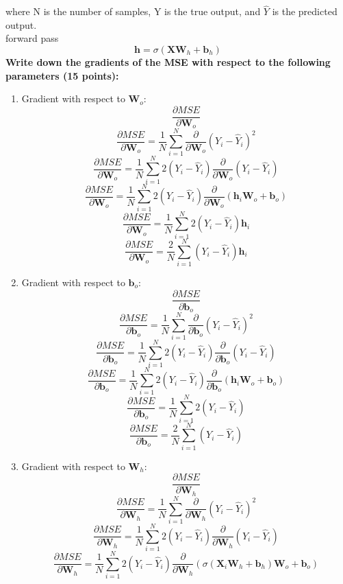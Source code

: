 \documentclass{article}
\begin{document}
where N is the number of samples, Y is the true output, and \(\hat{Y}\) is the predicted output.
\\ forward pass
\[
\mathbf{h} = \sigma(\mathbf{X} \mathbf{W}_h + \mathbf{b}_h)
\]
\textbf{Write down the gradients of the MSE with respect to the following parameters (15 points):}
\begin{enumerate}
    \item Gradient with respect to $\mathbf{W}_o$: $$\frac{\partial MSE}{\partial \mathbf{W}_o}$$
    \[
    \frac{\partial MSE}{\partial \mathbf{W}_o} = \frac{1}{N} \sum_{i=1}^{N} \frac{\partial}{\partial \mathbf{W}_o} (Y_i - \hat{Y}_i)^2
    \]
    \[
    \frac{\partial MSE}{\partial \mathbf{W}_o} = \frac{1}{N} \sum_{i=1}^{N} 2(Y_i - \hat{Y}_i) \frac{\partial}{\partial \mathbf{W}_o} (Y_i - \hat{Y}_i)
    \]
    \[
    \frac{\partial MSE}{\partial \mathbf{W}_o} = \frac{1}{N} \sum_{i=1}^{N} 2(Y_i - \hat{Y}_i) \frac{\partial}{\partial \mathbf{W}_o} (\mathbf{h}_i \mathbf{W}_o + \mathbf{b}_o)
    \]
    \[
    \frac{\partial MSE}{\partial \mathbf{W}_o} = \frac{1}{N} \sum_{i=1}^{N} 2(Y_i - \hat{Y}_i) \mathbf{h}_i
    \]
    \[
    \frac{\partial MSE}{\partial \mathbf{W}_o} = \frac{2}{N} \sum_{i=1}^{N} (Y_i - \hat{Y}_i) \mathbf{h}_i
    \]
    \item Gradient with respect to $\mathbf{b}_o$: $$\frac{\partial MSE}{\partial \mathbf{b}_o}$$
    \[
    \frac{\partial MSE}{\partial \mathbf{b}_o} = \frac{1}{N} \sum_{i=1}^{N} \frac{\partial}{\partial \mathbf{b}_o} (Y_i - \hat{Y}_i)^2
    \]
    \[
    \frac{\partial MSE}{\partial \mathbf{b}_o} = \frac{1}{N} \sum_{i=1}^{N} 2(Y_i - \hat{Y}_i) \frac{\partial}{\partial \mathbf{b}_o} (Y_i - \hat{Y}_i)
    \]
    \[
    \frac{\partial MSE}{\partial \mathbf{b}_o} = \frac{1}{N} \sum_{i=1}^{N} 2(Y_i - \hat{Y}_i) \frac{\partial}{\partial \mathbf{b}_o} (\mathbf{h}_i \mathbf{W}_o + \mathbf{b}_o)
    \]
    \[
    \frac{\partial MSE}{\partial \mathbf{b}_o} = \frac{1}{N} \sum_{i=1}^{N} 2(Y_i - \hat{Y}_i)
    \]
    \[
    \frac{\partial MSE}{\partial \mathbf{b}_o} = \frac{2}{N} \sum_{i=1}^{N} (Y_i - \hat{Y}_i)
    \]
    \item Gradient with respect to $\mathbf{W}_h$: $$\frac{\partial MSE}{\partial \mathbf{W}_h}$$
    \[
    \frac{\partial MSE}{\partial \mathbf{W}_h} = \frac{1}{N} \sum_{i=1}^{N} \frac{\partial}{\partial \mathbf{W}_h} (Y_i - \hat{Y}_i)^2
    \]
    \[
    \frac{\partial MSE}{\partial \mathbf{W}_h} = \frac{1}{N} \sum_{i=1}^{N} 2(Y_i - \hat{Y}_i) \frac{\partial}{\partial \mathbf{W}_h} (Y_i - \hat{Y}_i)
    \]
    \[
    \frac{\partial MSE}{\partial \mathbf{W}_h} = \frac{1}{N} \sum_{i=1}^{N} 2(Y_i - \hat{Y}_i) \frac{\partial}{\partial \mathbf{W}_h} (\sigma(\mathbf{X}_i \mathbf{W}_h + \mathbf{b}_h) \mathbf{W}_o + \mathbf{b}_o)
\]
\end{enumerate}
\end{document}
